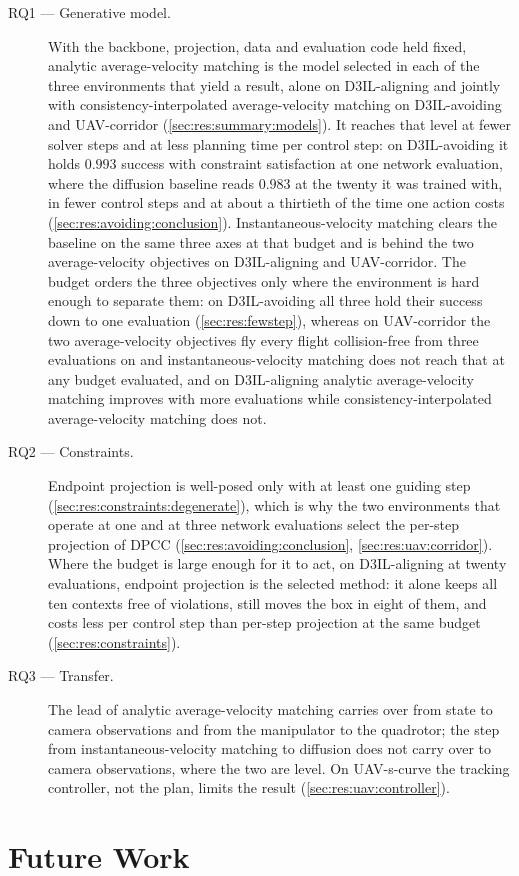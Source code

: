 \begin{description}
  \item[RQ1 --- Generative model.] With the backbone, projection, data and evaluation code held fixed,
    analytic average-velocity matching is the model selected in each of the three environments that yield
    a result, alone on D3IL-aligning and jointly with consistency-interpolated average-velocity matching
    on D3IL-avoiding and UAV-corridor (\autoref{sec:res:summary:models}). It reaches that level at fewer
    solver steps and at less planning time per control step: on D3IL-avoiding it holds $0.993$ success
    with constraint satisfaction at one network evaluation, where the diffusion baseline reads $0.983$ at
    the twenty it was trained with, in fewer control steps and at about a thirtieth of the time one action
    costs (\autoref{sec:res:avoiding:conclusion}). Instantaneous-velocity matching clears the baseline on
    the same three axes at that budget and is behind the two average-velocity objectives on D3IL-aligning
    and UAV-corridor. The budget orders the three objectives only where the environment is hard enough to
    separate them: on D3IL-avoiding all three hold their success down to one evaluation
    (\autoref{sec:res:fewstep}), whereas on UAV-corridor the two average-velocity objectives fly every
    flight collision-free from three evaluations on and instantaneous-velocity matching does not reach
    that at any budget evaluated, and on D3IL-aligning analytic average-velocity matching improves with
    more evaluations while consistency-interpolated average-velocity matching does not.
  \item[RQ2 --- Constraints.] Endpoint projection is well-posed only with at least one guiding step
    (\autoref{sec:res:constraints:degenerate}), which is why the two environments that operate at one and
    at three network evaluations select the per-step projection of \ac{DPCC}
    (\autoref{sec:res:avoiding:conclusion}, \autoref{sec:res:uav:corridor}). Where the budget is large
    enough for it to act, on D3IL-aligning at twenty evaluations, endpoint projection is the selected
    method: it alone keeps all ten contexts free of violations, still moves the box in eight of them, and
    costs less per control step than per-step projection at the same budget
    (\autoref{sec:res:constraints}).
  \item[RQ3 --- Transfer.] The lead of analytic average-velocity matching carries over from state to
    camera observations and from the manipulator to the quadrotor; the step from instantaneous-velocity
    matching to diffusion does not carry over to camera observations, where the two are level. On
    UAV-s-curve the tracking controller, not the plan, limits the result
    (\autoref{sec:res:uav:controller}).
\end{description}


\section{Future Work}\label{sec:conc:future}

